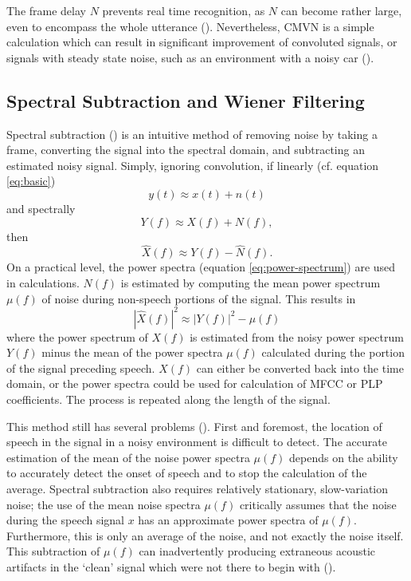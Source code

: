 The frame delay $N$ prevents real time recognition, as $N$ can become rather large, even to encompass the whole utterance (\cite{li:14}).  Nevertheless, CMVN is a simple calculation which can result in significant improvement of convoluted signals, or signals with steady state noise, such as an environment with a noisy car (\cite{viikki:98}).

\subsection{Spectral Subtraction and Wiener Filtering}\label{sec:spec-sub_wiener}

Spectral subtraction (\cite{boll:79}) is an intuitive method of removing noise by taking a frame, converting the signal into the spectral domain, and subtracting an estimated noisy signal. Simply, ignoring convolution, if linearly (cf. equation \ref{eq:basic}) \begin{equation} y(t) \approx x(t) + n(t) \end{equation} and spectrally \begin{equation} Y(f) \approx X(f) + N(f), \end{equation} then \begin{equation} \hat{X}(f) \approx Y(f) - \hat{N}(f). \end{equation}  On a practical level, the power spectra (equation \ref{eq:power-spectrum}) are used in calculations.  $N(f)$ is estimated by computing the mean power spectrum $\mu(f)$ of noise during non-speech portions of the signal.  This results in \begin{equation} |\hat{X}(f)|^2 \approx |Y(f)|^2 - \mu(f) \end{equation} where the power spectrum of $X(f)$ is estimated from the noisy power spectrum $Y(f)$ minus the mean of the power spectra $\mu(f)$ calculated during the portion of the signal preceding speech. $X(f)$ can either be converted back into the time domain, or the power spectra could be used for calculation of MFCC or PLP coefficients.  The process is repeated along the length of the signal.

This method still has several problems (\cite{li:14}). First and foremost, the location of speech in the signal in a noisy environment is difficult to detect.  The accurate estimation of the mean of the noise power spectra $\mu(f)$ depends on the ability to accurately detect the onset of speech and to stop the calculation of the average.  Spectral subtraction also requires relatively stationary, slow-variation noise; the use of the mean noise spectra $\mu(f)$ critically assumes that the noise during the speech signal $x$ has an approximate power spectra of $\mu(f)$.  Furthermore, this is only an average of the noise, and not exactly the noise itself.  This subtraction of $\mu(f)$ can inadvertently producing extraneous acoustic artifacts in the `clean' signal which were not there to begin with (\cite{berouti:79}).

